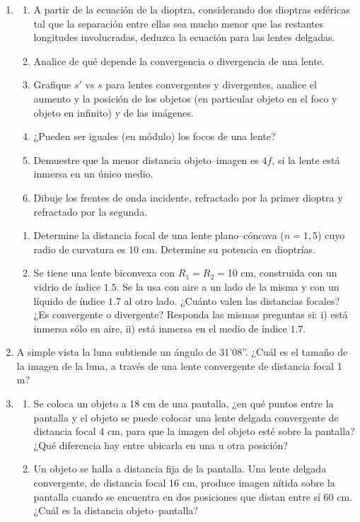 \documentclass[11pt,spanish,a4paper]{article}
\begin{document}
\begin{enumerate}
\item 
\begin{enumerate}
\item A partir de la ecuación de la dioptra, considerando dos dioptras esféricas
tal que la separación entre ellas sea mucho menor que las restantes
longitudes involucradas, deduzca la ecuación para las lentes delgadas.
\item Analice de qué depende la convergencia o divergencia de una lente.
\item Grafique $s'$ vs $s$ para lentes convergentes y divergentes, analice
el aumento y la posición de los objetos (en particular objeto en el
foco y objeto en infinito) y de las imágenes.
\item ¿Pueden ser iguales (en módulo) los focos de una lente?
\item Demuestre que la menor distancia objeto--imagen es $4f$, si la lente
está inmersa en un único medio.
\item Dibuje los frentes de onda incidente, refractado por la primer dioptra
y refractado por la segunda.
\end{enumerate}


\begin{enumerate}
\item Determine la distancia focal de una lente plano--cóncava ($n=1,5$)
cuyo radio de curvatura es 10 cm. Determine su potencia en dioptrías.
\item Se tiene una lente biconvexa con $R_{1}=R_{2}=$10 cm, construida
con un vidrio de índice $1.5$. Se la usa con aire a un lado de la
misma y con un líquido de índice $1.7$ al otro lado. ¿Cuánto valen
las distancias focales? ¿Es convergente o divergente? Responda las
mismas preguntas si: i) está inmersa sólo en aire, ii) está inmersa
en el medio de índice $1.7$.
\end{enumerate}


\item A simple vista la luna subtiende un ángulo de 31'08''. ¿Cuál es el
tamaño de la imagen de la luna, a través de una lente convergente
de distancia focal 1 m?

\item
\begin{enumerate}
\item Se coloca un objeto a 18 cm de una pantalla, ¿en qué puntos entre
la pantalla y el objeto se puede colocar una lente delgada convergente
de distancia focal 4 cm, para que la imagen del objeto esté sobre
la pantalla? ¿Qué diferencia hay entre ubicarla en una u otra posición?
\item Un objeto se halla a distancia fija de la pantalla. Una lente delgada
convergente, de distancia focal 16 cm, produce imagen nítida sobre
la pantalla cuando se encuentra en dos posiciones que distan entre
sí 60 cm. ¿Cuál es la distancia objeto--pantalla?
\end{enumerate}



\end{enumerate}
\end{document}
